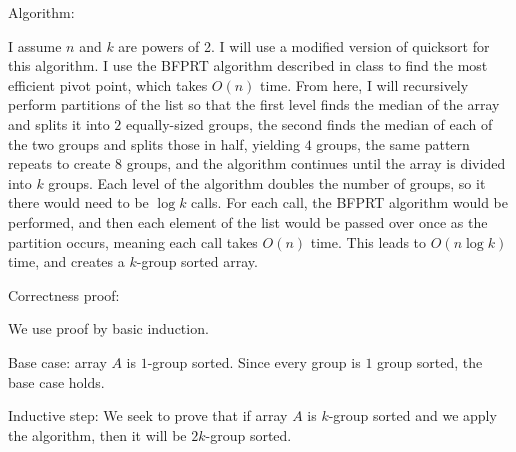 \documentclass[11pt]{article}
\begin{document}
\bigbreak

Algorithm:

I assume $n$ and $k$ are powers of 2. 
I will use a modified version of quicksort for this algorithm. I use the BFPRT algorithm described in class to find the most efficient pivot point, which takes $O(n)$ time. 
From here, I will recursively perform partitions of the list so that the first level finds the median of the array and splits it into $2$ equally-sized groups, 
the second finds the median of each of the two groups and splits those in half, yielding $4$ groups, 
the same pattern repeats to create $8$ groups, and the algorithm continues until the array is divided into $k$ groups. 
Each level of the algorithm doubles the number of groups, so it there would need to be $\log k$ calls. 
For each call, the BFPRT algorithm would be performed, and then 
each element of the list would be passed over once as the partition occurs, 
meaning each call takes $O(n)$ time. 
This leads to $O(n \log k)$ time, and creates a $k$-group sorted array.

\bigbreak

Correctness proof:

We use proof by basic induction.

Base case: array $A$ is $1$-group sorted. Since every group is $1$ group sorted, the base case holds.

Inductive step: We seek to prove that if array $A$ is $k$-group sorted and we apply the algorithm, then it will be $2k$-group sorted.
\end{document}
